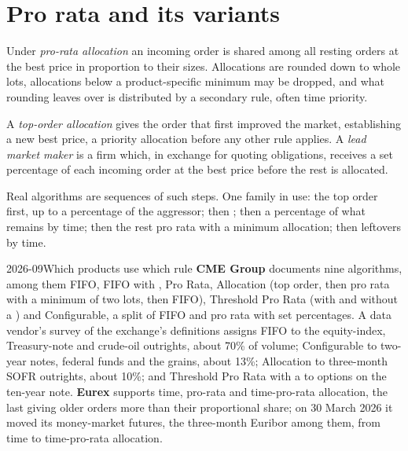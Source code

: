 \section{Pro rata and its variants}

\begin{definition}\label{def:m1:matching-algorithms-and-implied-spreads:prorata}
Under \emph{pro-rata allocation} an incoming order
is shared among all resting orders at the best price in proportion to their
sizes. Allocations are rounded down to whole lots, allocations below a
product-specific minimum may be dropped, and what rounding leaves over is
distributed by a secondary rule, often time priority.
\end{definition}

\begin{definition}\label{def:m1:matching-algorithms-and-implied-spreads:top}
A \emph{top-order allocation} gives the order
that first improved the market, establishing a new best price, a priority
allocation before any other rule applies. A \emph{lead market
maker} is a firm which, in exchange for quoting
obligations, receives a set percentage of each incoming order at the best
price before the rest is allocated.
\end{definition}

Real algorithms are sequences of such steps. One family in use: the top
order first, up to a percentage of the aggressor; then ;
then a percentage of what remains by time; then the rest pro rata with a
minimum allocation; then leftovers by time.

\begin{dated}{2026-09}{Which products use which rule}\label{dat:m1:matching-algorithms-and-implied-spreads:which}
\textbf{CME Group} documents nine algorithms, among them FIFO, FIFO with
, Pro Rata, Allocation (top order, then pro rata with a
minimum of two lots, then FIFO), Threshold Pro Rata (with and without a ) and Configurable, a split of FIFO and pro rata with set
percentages. A data vendor's survey of the exchange's definitions assigns
FIFO to the equity-index, Treasury-note and crude-oil outrights, about 70\%
of volume; Configurable to two-year notes, federal funds and the grains,
about 13\%; Allocation to three-month SOFR outrights, about 10\%; and
Threshold Pro Rata with a  to options on the ten-year note.
\textbf{Eurex} supports time, pro-rata and time-pro-rata allocation, the last
giving older orders more than their proportional share; on 30 March 2026 it
moved its money-market futures, the three-month Euribor among them, from time
to time-pro-rata allocation.
\end{dated}

